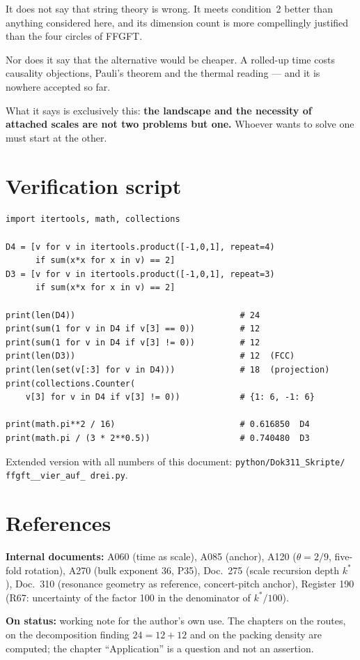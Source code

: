 \documentclass[11pt]{report}
\begin{document}
It does not say that string theory is wrong. It meets condition~2
better than anything considered here, and its dimension count is more
compellingly justified than the four circles of FFGFT.

Nor does it say that the alternative would be cheaper. A rolled-up time
costs causality objections, Pauli's theorem and the thermal reading ---
and it is nowhere accepted so far.

What it says is exclusively this: \textbf{the landscape and the
necessity of attached scales are not two problems but one.} Whoever
wants to solve one must start at the other.

\chapter{Verification script}

\begin{verbatim}
import itertools, math, collections

D4 = [v for v in itertools.product([-1,0,1], repeat=4)
      if sum(x*x for x in v) == 2]
D3 = [v for v in itertools.product([-1,0,1], repeat=3)
      if sum(x*x for x in v) == 2]

print(len(D4))                                 # 24
print(sum(1 for v in D4 if v[3] == 0))         # 12
print(sum(1 for v in D4 if v[3] != 0))         # 12
print(len(D3))                                 # 12  (FCC)
print(len(set(v[:3] for v in D4)))             # 18  (projection)
print(collections.Counter(
    v[3] for v in D4 if v[3] != 0))            # {1: 6, -1: 6}

print(math.pi**2 / 16)                         # 0.616850  D4
print(math.pi / (3 * 2**0.5))                  # 0.740480  D3
\end{verbatim}

Extended version with all numbers of this document:
\texttt{python/\allowbreak Dok311\_\allowbreak Skripte/\allowbreak
ffgft\_\_\allowbreak vier\_\allowbreak auf\_\allowbreak
drei.py}.

\chapter{References}

\textbf{Internal documents:} A060 (time as scale), A085 (anchor), A120
($\theta = 2/9$, five-fold rotation), A270 (bulk exponent 36, P35),
Doc.~275 (scale recursion depth $k^*$), Doc.~310 (resonance geometry as
reference, concert-pitch anchor), Register 190 (R67: uncertainty of the
factor 100 in the denominator of $k^*/100$).

\medskip
\noindent\textbf{On status:} working note for the author's own use. The
chapters on the routes, on the decomposition finding $24 = 12+12$ and
on the packing density are computed; the chapter
\enquote{Application} is a question and not an assertion.
\end{document}
